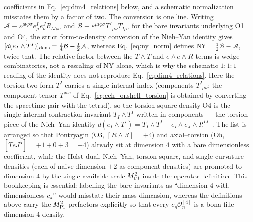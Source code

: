 \documentclass[aps,prd,twocolumn,superscriptaddress,showpacs,preprintnumbers,nofootinbib,longbibliography,floatfix]{revtex4-2}
\newcommand{\MPl}{M_{\rm Pl}}
\begin{document}
coefficients in Eq.~\eqref{eq:dim4_relations} below, and a schematic
normalization misstates them by a factor of two. The conversion is one
line. Writing $\mathcal{A}\equiv\varepsilon^{\mu\nu\rho\sigma}
e^I_\mu e^J_\nu R_{IJ\rho\sigma}$ and
$\mathcal{B}\equiv\varepsilon^{\mu\nu\rho\sigma}
T^{I}{}_{\mu\nu}T_{I\rho\sigma}$ for the bare invariants underlying O1
and O4, the strict form-to-density conversion of the Nieh--Yan identity
gives $[d(e_I\wedge T^I)]_{\rm dens}=\tfrac14\mathcal{B}
-\tfrac12\mathcal{A}$, whereas Eq.~\eqref{eq:ny_norm} defines
$\mathrm{NY}=\tfrac12\mathcal{B}-\mathcal{A}$, twice that. The relative
factor between the $T\wedge T$ and $e\wedge e\wedge R$ terms is wedge
combinatorics, not a rescaling of $\mathrm{NY}$ alone, which is why the
schematic $1\!:\!1\!:\!1$ reading of the identity does not reproduce
Eq.~\eqref{eq:dim4_relations}.
Here the torsion two-form $T^I$ carries a single internal index
(components $T^{I}{}_{\mu\nu}$; the component tensor $T^{abc}$ of
Eq.~\eqref{eq:ech_onshell_torsion} is obtained by converting the
spacetime pair with the tetrad), so the torsion-square density O4 is the
single-internal-contraction invariant $T_I\wedge T^I$ written in
components --- the torsion piece of the Nieh--Yan identity
$d(e_I\wedge T^I)=T_I\wedge T^I-e_I\wedge e_J\wedge
R^{IJ}$~\cite{NiehYan1982}. The list is arranged
so that Pontryagin (O3, $[R\wedge R]=+4$) and axial--torsion
(O5, $[TeJ^5]=+1+0+3=+4$) already sit at dimension $4$ with a bare
dimensionless coefficient, while the Holst dual, Nieh--Yan, torsion-square,
and single-curvature densities (each of naive dimension $+2$ as component
densities) are promoted to dimension $4$ by the single available scale
$\MPl^{2}$ inside the operator definition. This bookkeeping is essential:
labelling the bare invariants as ``dimension-$4$ with dimensionless $c_n$''
would misstate their mass dimension, whereas the definitions above carry the
$\MPl^{2}$ prefactors explicitly so that every
$c_n\mathcal{O}_n^{[4]}$ is a bona-fide dimension-$4$ density.
\end{document}
